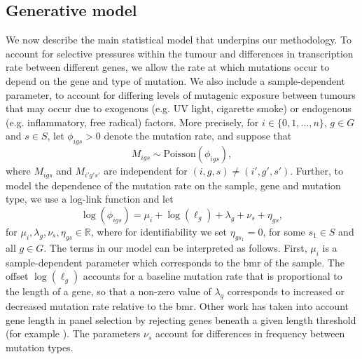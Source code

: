 \documentclass[12pt]{article}
\begin{document}
\subsection{Generative model \label{sec:genmodel}}
We now describe the main statistical model that underpins our methodology. To account for selective pressures within the tumour and differences in transcription rate between different genes, we allow the rate at which mutations occur to depend on the gene and type of mutation. We also include a sample-dependent parameter, to account for differing levels of mutagenic exposure between tumours that may occur due to exogenous (e.g. UV light, cigarette smoke) or endogenous (e.g. inflammatory, free radical) factors.  More precisely, for $i \in \{0, 1, \ldots, n\}$, $g \in G$ and $s \in S$, let $\phi_{igs} > 0$ denote the mutation rate, and suppose that
\begin{equation}
    \label{eq:Poisson}
M_{igs} \sim \mathrm{Poisson}(\phi_{igs}),
\end{equation}
where $M_{igs}$ and $M_{i'g's'}$ are independent for $(i,g,s) \neq (i',g',s')$.  Further, to model the dependence of the mutation rate on the sample, gene and mutation type, we use a log-link function and let 
\begin{equation}
    \label{eq:loglink}
\log(\phi_{igs}) =  \mu_i + \log(\ell_g) + \lambda_g + \nu_s + \eta_{gs},
\end{equation} 
for $\mu_i, \lambda_{g},\nu_{s},\eta_{gs} \in \mathbb{R}$, where for identifiability we set $\eta_{gs_1} = 0$, for  some $s_1 \in S$ and all $g \in G$. The terms in our model can be interpreted as follows. First, $\mu_i$ is a sample-dependent parameter which corresponds to the \acrshort{bmr} of the sample. The offset $\log(\ell_g)$ accounts for a baseline mutation rate that is proportional to the length of a gene, so that a non-zero value of $\lambda_g$ corresponds to increased or decreased mutation rate relative to the \acrshort{bmr}. Other work has taken into account gene length in panel selection by rejecting genes beneath a given length threshold (for example \citet{lyu_mutation_2018}). The parameters $\nu_s$ account for differences in frequency between mutation types. 
\end{document}
